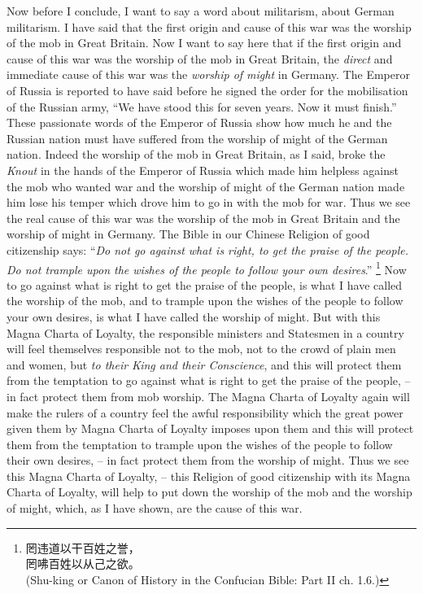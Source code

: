 Now before I conclude, I want to say a word about militarism, about German militarism.
I have said that the first origin and cause of this war was the worship of the mob in Great Britain.
Now I want to say here that if the first origin and cause of this war was the worship of the mob in Great Britain,
the \emph{direct} and immediate cause of this war was the \emph{worship of might} in Germany.
The Emperor of Russia is reported to have said before he signed the order for the mobilisation of the Russian army, ``We have stood this for seven years. Now it must finish.''
These passionate words of the Emperor of Russia show how much he and the Russian nation must have suffered from the worship of might of the German nation. Indeed the worship of the mob in Great Britain,
as I said, broke the \emph{Knout} in the hands of the Emperor of Russia which made him helpless against the mob who wanted war and the worship of might of the German nation made him lose his temper which drove him to go in with the mob for war.
Thus we see the real cause of this war was the worship of the mob in Great Britain and the worship of might in Germany. The Bible in our Chinese Religion of good citizenship says:
``\emph{Do not go against what is right, to get the praise of the people.
Do not trample upon the wishes of the people to follow your own desires}.''
\footnote{
罔违道以干百姓之誉，\\
罔咈百姓以从己之欲。\\
(Shu-king or Canon of History in the Confucian Bible: Part II ch. 1.6.)
}
Now to go against what is right to get the praise of the people, is what I have called the worship of the mob,
and to trample upon the wishes of the people to follow your own desires, is what I have called the worship of might.
But with this Magna Charta of Loyalty, the responsible ministers and Statesmen in a country will feel themselves responsible not to the mob, not to the crowd of plain men and women,
but \emph{to their King and their Conscience}, and this will protect them from the temptation to go against what is right to get the praise of the people,
-- in fact protect them from mob worship. The Magna Charta of Loyalty again will make the rulers of a country feel the awful responsibility which the great power given them by Magna Charta of Loyalty imposes upon them and this will protect them from the temptation to trample upon the wishes of the people to follow their own desires,
-- in fact protect them from the worship of might. Thus we see this Magna Charta of Loyalty,
-- this Religion of good citizenship with its Magna Charta of Loyalty,
will help to put down the worship of the mob and the worship of might,
which, as I have shown, are the cause of this war.

